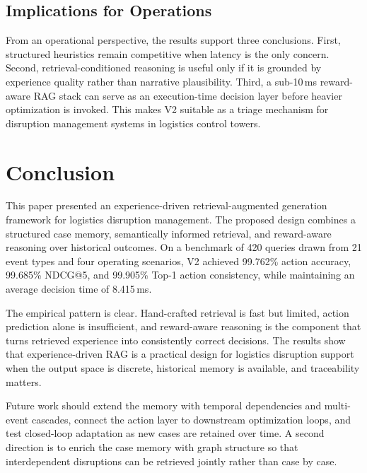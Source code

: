 \documentclass[conference]{IEEEtran}
\begin{document}
\subsection{Implications for Operations}

From an operational perspective, the results support three conclusions. First, structured heuristics remain competitive when latency is the only concern. Second, retrieval-conditioned reasoning is useful only if it is grounded by experience quality rather than narrative plausibility. Third, a sub-10\,ms reward-aware RAG stack can serve as an execution-time decision layer before heavier optimization is invoked. This makes V2 suitable as a triage mechanism for disruption management systems in logistics control towers.

\section{Conclusion}
\label{sec:conclusion}

This paper presented an experience-driven retrieval-augmented generation framework for logistics disruption management. The proposed design combines a structured case memory, semantically informed retrieval, and reward-aware reasoning over historical outcomes. On a benchmark of 420 queries drawn from 21 event types and four operating scenarios, V2 achieved 99.762\% action accuracy, 99.685\% NDCG@5, and 99.905\% Top-1 action consistency, while maintaining an average decision time of 8.415\,ms.

The empirical pattern is clear. Hand-crafted retrieval is fast but limited, action prediction alone is insufficient, and reward-aware reasoning is the component that turns retrieved experience into consistently correct decisions. The results show that experience-driven RAG is a practical design for logistics disruption support when the output space is discrete, historical memory is available, and traceability matters.

Future work should extend the memory with temporal dependencies and multi-event cascades, connect the action layer to downstream optimization loops, and test closed-loop adaptation as new cases are retained over time. A second direction is to enrich the case memory with graph structure so that interdependent disruptions can be retrieved jointly rather than case by case.



\end{document}
